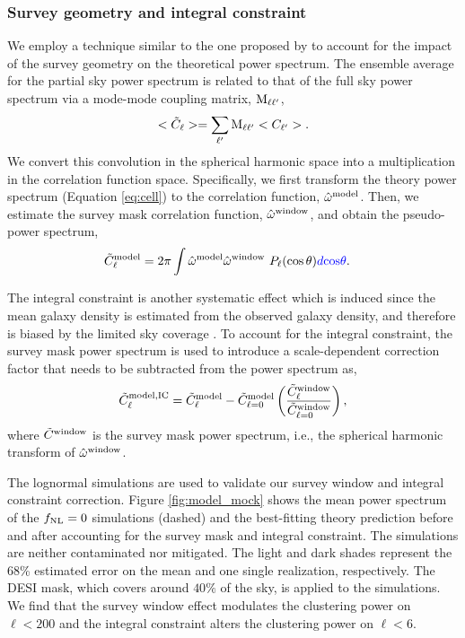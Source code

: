 \subsubsection{Survey geometry and integral constraint}
We employ a technique similar to the one proposed by \cite{chon2004fast} to account for the impact of the survey geometry on the theoretical power spectrum. The ensemble average for the partial sky power spectrum is related to that of the full sky power spectrum via a mode-mode coupling matrix, ${\rm M}_{\ell \ell^{\prime}}$,
\begin{equation}\label{eq:mixm}
    <\tilde{C}_{\ell}> = \sum_{\ell^{\prime}} {\rm M}_{\ell \ell^{\prime}}<C_{\ell^{\prime}}>.
\end{equation}
We convert this convolution in the spherical harmonic space into a multiplication in the correlation function space. Specifically, we first transform the theory power spectrum (Equation \ref{eq:cell}) to the correlation function, $\hat{\omega}^{\rm model}$. Then, we estimate the survey mask correlation function, $\hat{\omega}^{\rm window}$, and obtain the pseudo-power spectrum,
\begin{align}
    \tilde{C}^{\rm model}_{\ell} &= 2\pi \int \hat{\omega}^{\rm model}\hat{\omega}^{\rm window}~P_{\ell}(\cos\theta) \textcolor{blue}{d{\rm cos}\theta}.
\end{align}

The integral constraint is another systematic effect which is induced since the mean galaxy density is estimated from the observed galaxy density, and therefore is biased by the limited sky coverage \citep{peacock1991large}. To account for the integral constraint, the survey mask power spectrum is used to introduce a scale-dependent correction factor that needs to be subtracted from the power spectrum as,
\begin{equation}
     \tilde{C}^{\rm model, IC}_{\ell} = \tilde{C}^{\rm model}_{\ell} - \tilde{C}^{\rm model}_{\ell=0} \left(\frac{\tilde{C}^{\rm window}_{\ell}}{\tilde{C}^{\rm window}_{\ell=0}}\right),
\end{equation}
where $\tilde{C}^{\rm window}$ is the survey mask power spectrum, i.e., the spherical harmonic transform of $\hat{\omega}^{\rm window}$.

The lognormal simulations are used to validate our survey window and integral constraint correction. Figure \ref{fig:model_mock} shows the mean power spectrum of the $f_{\rm NL}=0$ simulations (dashed) and the best-fitting theory prediction before and after accounting for the survey mask and integral constraint. The simulations are neither contaminated nor mitigated. The light and dark shades represent the 68\% estimated error on the mean and one single realization, respectively. The DESI mask, which covers around $40\%$ of the sky, is applied to the simulations. We find that the survey window effect modulates the clustering power on $\ell < 200$ and the integral constraint alters the clustering power on $\ell < 6$.

